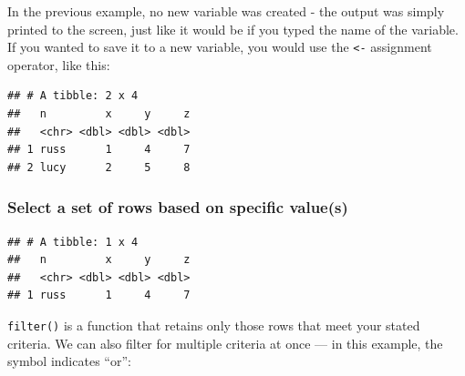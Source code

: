 \documentclass[12pt,]{book}
\newenvironment{Shaded}{\begin{snugshade}}{\end{snugshade}}
\newcommand{\DecValTok}[1]{\textcolor[rgb]{0.00,0.00,0.81}{#1}}
\newcommand{\KeywordTok}[1]{\textcolor[rgb]{0.13,0.29,0.53}{\textbf{#1}}}
\newcommand{\NormalTok}[1]{#1}
\newcommand{\OperatorTok}[1]{\textcolor[rgb]{0.81,0.36,0.00}{\textbf{#1}}}
\newcommand{\StringTok}[1]{\textcolor[rgb]{0.31,0.60,0.02}{#1}}
\begin{document}
In the previous example, no new variable was created - the output was simply printed to the screen, just like it would be if you typed the name of the variable. If you wanted to save it to a new variable, you would use the \texttt{\textless{}-} assignment operator, like this:

\begin{Shaded}
\end{Shaded}

\begin{verbatim}
## # A tibble: 2 x 4
##   n         x     y     z
##   <chr> <dbl> <dbl> <dbl>
## 1 russ      1     4     7
## 2 lucy      2     5     8
\end{verbatim}

\hypertarget{select-a-set-of-rows-based-on-specific-values}{%
\subsubsection{Select a set of rows based on specific value(s)}\label{select-a-set-of-rows-based-on-specific-values}}

\begin{Shaded}
\end{Shaded}

\begin{verbatim}
## # A tibble: 1 x 4
##   n         x     y     z
##   <chr> <dbl> <dbl> <dbl>
## 1 russ      1     4     7
\end{verbatim}

\texttt{filter()} is a function that retains only those rows that meet your stated criteria. We can also filter for multiple criteria at once --- in this example, the \texttt{\textbar{}} symbol indicates ``or'':

\begin{Shaded}
\end{Shaded}
\end{document}
